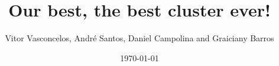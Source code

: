 \documentclass[notitlepage]{report}
\title{Our best, the best cluster ever!}
\author{Vitor Vasconcelos, Andr\'e Santos, Daniel Campolina and Graiciany Barros}
\date{\today}
\begin{document}
\maketitle
\thispagestyle{empty}

\begin{abstract}

\end{abstract}
\end{document}
